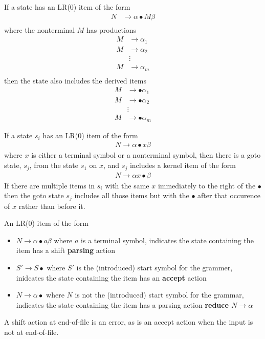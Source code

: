 If a state has an LR(0) item of the form
\begin{align*}
    N &\rightarrow \alpha \bullet M \beta \\
\end{align*}
where the nonterminal $M$ has productions
\begin{align*}
    M &\rightarrow \alpha_1 \\
    M &\rightarrow \alpha_2 \\
    &\vdots \\
    M &\rightarrow \alpha_m \\
\end{align*}
then the state also includes the derived items
\begin{align*}
    M &\rightarrow \bullet \alpha_1 \\
    M &\rightarrow \bullet \alpha_2 \\
    &\vdots \\
    M &\rightarrow \bullet \alpha_m
\end{align*}

If a state $s_i$ has an LR(0) item of the form
\begin{align*}
    N \rightarrow \alpha \bullet x \beta
\end{align*}
where $x$ is either a terminal symbol or a nonterminal symbol, then there is a goto state, 
$s_j$, from the state $s_1$ on $x$, and $s_j$ includes a kernel item of the form
\begin{align*}
    N \rightarrow \alpha x \bullet \beta
\end{align*}
If there are multiple items in $s_i$ with the same $x$ immediately to the right of the 
$\bullet$ then the goto state $s_j$ includes all those items but with the $\bullet$ after 
that occurence of $x$ rather than before it.

An LR(0) item of the form
\begin{itemize}
    \item $N \rightarrow \alpha \bullet a \beta$ where $a$ is a terminal symbol, indicates 
    the state containing the item has a shift  \textbf{parsing} action
    \item $S' \rightarrow S \bullet$ where $S'$ is the (introduced) start symbol for the 
    grammer, inidcates the state containing the item has an  \textbf{accept} action
    \item $N \rightarrow \alpha \bullet$ where $N$ is not the (introduced) start symbol for 
    the grammar, indicates the state containing the item has a parsing action 
    \textbf{reduce $N \rightarrow \alpha$}
\end{itemize}
A shift action at end-of-file is an error, as is an accept action when the input is not at 
end-of-file.

